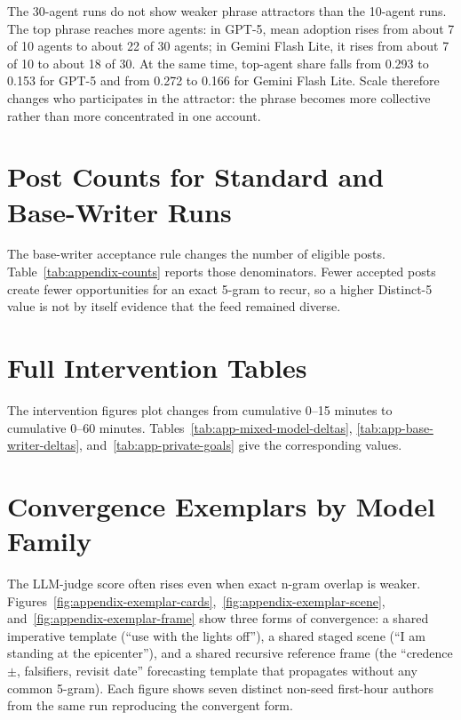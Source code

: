 The 30-agent runs do not show weaker phrase attractors than the 10-agent runs. The top phrase reaches more agents: in GPT-5, mean adoption rises from about 7 of 10 agents to about 22 of 30 agents; in Gemini Flash Lite, it rises from about 7 of 10 to about 18 of 30. At the same time, top-agent share falls from 0.293 to 0.153 for GPT-5 and from 0.272 to 0.166 for Gemini Flash Lite. Scale therefore changes who participates in the attractor: the phrase becomes more collective rather than more concentrated in one account.

\section{Post Counts for Standard and Base-Writer Runs}
\label{app:base-counts}

The base-writer acceptance rule changes the number of eligible posts. Table~\ref{tab:appendix-counts} reports those denominators. Fewer accepted posts create fewer opportunities for an exact 5-gram to recur, so a higher Distinct-5 value is not by itself evidence that the feed remained diverse.

\section{Full Intervention Tables}
\label{app:full-intervention-tables}

The intervention figures plot changes from cumulative 0--15 minutes to cumulative 0--60 minutes. Tables~\ref{tab:app-mixed-model-deltas}, \ref{tab:app-base-writer-deltas}, and~\ref{tab:app-private-goals} give the corresponding values.

\section{Convergence Exemplars by Model Family}
\label{app:mixed-exemplars}

The LLM-judge score often rises even when exact n-gram overlap is weaker. Figures~\ref{fig:appendix-exemplar-cards},~\ref{fig:appendix-exemplar-scene}, and~\ref{fig:appendix-exemplar-frame} show three forms of convergence: a shared imperative template (``use with the lights off''), a shared staged scene (``I am standing at the epicenter''), and a shared recursive reference frame (the ``credence \(\pm\), falsifiers, revisit date'' forecasting template that propagates without any common 5-gram). Each figure shows seven distinct non-seed first-hour authors from the same run reproducing the convergent form.

